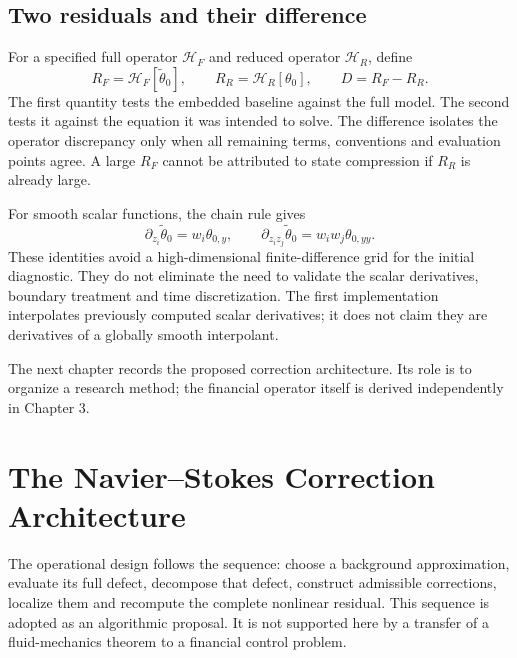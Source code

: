\section{Two residuals and their difference}
For a specified full operator $\mathcal H_F$ and reduced operator $\mathcal H_R$, define
\[
 R_F=\mathcal H_F[\widetilde\theta_0],\qquad
 R_R=\mathcal H_R[\theta_0],\qquad D=R_F-R_R.
\]
The first quantity tests the embedded baseline against the full model. The second tests it against the equation it was intended to solve. The difference isolates the operator discrepancy only when all remaining terms, conventions and evaluation points agree. A large $R_F$ cannot be attributed to state compression if $R_R$ is already large.

For smooth scalar functions, the chain rule gives
\[
 \partial_{z_i}\widetilde\theta_0=w_i\theta_{0,y},\qquad
 \partial_{z_i z_j}\widetilde\theta_0=w_iw_j\theta_{0,yy}.
\]
These identities avoid a high-dimensional finite-difference grid for the initial diagnostic. They do not eliminate the need to validate the scalar derivatives, boundary treatment and time discretization. The first implementation interpolates previously computed scalar derivatives; it does not claim they are derivatives of a globally smooth interpolant.

The next chapter records the proposed correction architecture. Its role is to organize a research method; the financial operator itself is derived independently in Chapter 3.

\chapter{The Navier--Stokes Correction Architecture}

The operational design follows the sequence: choose a background approximation, evaluate its full defect, decompose that defect, construct admissible corrections, localize them and recompute the complete nonlinear residual. This sequence is adopted as an algorithmic proposal. It is not supported here by a transfer of a fluid-mechanics theorem to a financial control problem.


